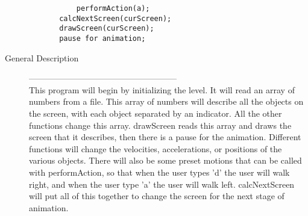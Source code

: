 \documentclass{article}
\begin{document}
\begin{description}
\begin{verbatim}
           performAction(a);
       calcNextScreen(curScreen);
       drawScreen(curScreen);
       pause for animation;
\end{verbatim}
\item[General Description]-----------------------------------------------------\\
This program will begin by initializing the level. It will read an array of 
numbers from a file.  This array of numbers will describe all the objects
on the screen, with each object separated by an indicator.  All the other
functions change this array.  drawScreen reads this array and draws the
screen that it describes, then there is a pause for the animation.  Different
functions will change the velocities, accelerations, or positions of the
various objects.  There will also be some preset motions that can be called
with performAction, so that when the user types 'd' the user will walk right,
and when the user type 'a' the user will walk left.  calcNextScreen will
put all of this together to change the screen for the next stage of animation.
\end{description}
\end{document}
